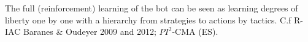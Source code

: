 The full (reinforcement) learning of the bot can be seen as learning degrees of liberty one by one with a hierarchy from strategies to actions by tactics. C.f R-IAC Baranes \& Oudeyer 2009 and 2012; $PI^2$-CMA (ES).






